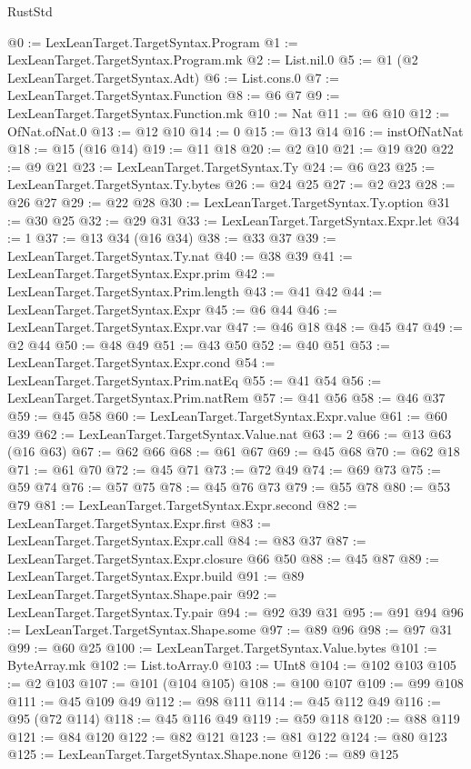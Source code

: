 \begin{lexlean}{RustStd}
\begin{coremodule}
{\begin{coremodule}
{{{{{{{{{{{{@0 := LexLeanTarget.TargetSyntax.Program
@1 := LexLeanTarget.TargetSyntax.Program.mk
@2 := List.nil.{0}
@5 := @1 (@2 LexLeanTarget.TargetSyntax.Adt)
@6 := List.cons.{0}
@7 := LexLeanTarget.TargetSyntax.Function
@8 := @6 @7
@9 := LexLeanTarget.TargetSyntax.Function.mk
@10 := Nat
@11 := @6 @10
@12 := OfNat.ofNat.{0}
@13 := @12 @10
@14 := 0
@15 := @13 @14
@16 := instOfNatNat
@18 := @15 (@16 @14)
@19 := @11 @18
@20 := @2 @10
@21 := @19 @20
@22 := @9 @21
@23 := LexLeanTarget.TargetSyntax.Ty
@24 := @6 @23
@25 := LexLeanTarget.TargetSyntax.Ty.bytes
@26 := @24 @25
@27 := @2 @23
@28 := @26 @27
@29 := @22 @28
@30 := LexLeanTarget.TargetSyntax.Ty.option
@31 := @30 @25
@32 := @29 @31
@33 := LexLeanTarget.TargetSyntax.Expr.let
@34 := 1
@37 := @13 @34 (@16 @34)
@38 := @33 @37
@39 := LexLeanTarget.TargetSyntax.Ty.nat
@40 := @38 @39
@41 := LexLeanTarget.TargetSyntax.Expr.prim
@42 := LexLeanTarget.TargetSyntax.Prim.length
@43 := @41 @42
@44 := LexLeanTarget.TargetSyntax.Expr
@45 := @6 @44
@46 := LexLeanTarget.TargetSyntax.Expr.var
@47 := @46 @18
@48 := @45 @47
@49 := @2 @44
@50 := @48 @49
@51 := @43 @50
@52 := @40 @51
@53 := LexLeanTarget.TargetSyntax.Expr.cond
@54 := LexLeanTarget.TargetSyntax.Prim.natEq
@55 := @41 @54
@56 := LexLeanTarget.TargetSyntax.Prim.natRem
@57 := @41 @56
@58 := @46 @37
@59 := @45 @58
@60 := LexLeanTarget.TargetSyntax.Expr.value
@61 := @60 @39
@62 := LexLeanTarget.TargetSyntax.Value.nat
@63 := 2
@66 := @13 @63 (@16 @63)
@67 := @62 @66
@68 := @61 @67
@69 := @45 @68
@70 := @62 @18
@71 := @61 @70
@72 := @45 @71
@73 := @72 @49
@74 := @69 @73
@75 := @59 @74
@76 := @57 @75
@78 := @45 @76 @73
@79 := @55 @78
@80 := @53 @79
@81 := LexLeanTarget.TargetSyntax.Expr.second
@82 := LexLeanTarget.TargetSyntax.Expr.first
@83 := LexLeanTarget.TargetSyntax.Expr.call
@84 := @83 @37
@87 := LexLeanTarget.TargetSyntax.Expr.closure @66 @50
@88 := @45 @87
@89 := LexLeanTarget.TargetSyntax.Expr.build
@91 := @89 LexLeanTarget.TargetSyntax.Shape.pair
@92 := LexLeanTarget.TargetSyntax.Ty.pair
@94 := @92 @39 @31
@95 := @91 @94
@96 := LexLeanTarget.TargetSyntax.Shape.some
@97 := @89 @96
@98 := @97 @31
@99 := @60 @25
@100 := LexLeanTarget.TargetSyntax.Value.bytes
@101 := ByteArray.mk
@102 := List.toArray.{0}
@103 := UInt8
@104 := @102 @103
@105 := @2 @103
@107 := @101 (@104 @105)
@108 := @100 @107
@109 := @99 @108
@111 := @45 @109 @49
@112 := @98 @111
@114 := @45 @112 @49
@116 := @95 (@72 @114)
@118 := @45 @116 @49
@119 := @59 @118
@120 := @88 @119
@121 := @84 @120
@122 := @82 @121
@123 := @81 @122
@124 := @80 @123
@125 := LexLeanTarget.TargetSyntax.Shape.none
@126 := @89 @125
}}}}}}}}}}}}
\end{coremodule}}
\end{coremodule}
\end{lexlean}
